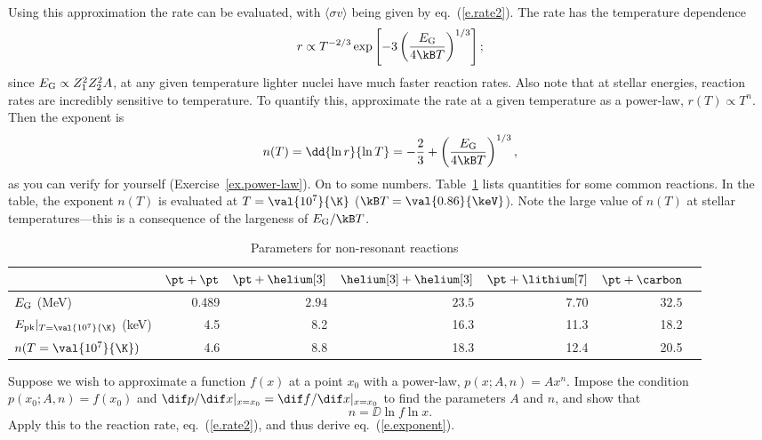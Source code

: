 Using this approximation the rate can be evaluated, with $\langle\sigma v\rangle$ being given by eq.~(\ref{e.rate2}). The rate has the temperature dependence
\[
	r \propto T^{-2/3} \exp\left[-3\left(\frac{\EG}{4\kB T}\right)^{1/3}\right];
\]
since $E_{\mathrm{G}} \propto Z_{1}^{2}Z_{2}^{2}A$, at any given temperature lighter nuclei have much faster reaction rates. Also note that at stellar energies, reaction rates are incredibly sensitive to temperature. To quantify this, approximate the rate at a given temperature as a power-law, $r(T)\propto T^{n}$. Then the exponent is
\begin{equation}\label{e.exponent}
 n(T) = \dd{\ln r}{\ln T} = -\frac{2}{3} + \left(\frac{\EG}{4\kB T}\right)^{1/3},
\end{equation}
as you can verify for yourself (Exercise~\ref{ex.power-law}). On to some numbers. Table~\ref{t.reaction} lists quantities for some common reactions. 
In the table, the exponent $n(T)$ is evaluated at $T = \val{10^{7}}{\K}$ ($\kB T = \val{0.86}{\keV}$). Note the large value of $n(T)$ at stellar temperatures---this is a consequence of the largeness of $\EG/\kB T$.
 
\begin{table}[hb]
\caption{\label{t.reaction} Parameters for non-resonant reactions}
\begin{tabular}{lrrrrrr}
 & $\pt+\pt$ & $\pt+\helium[3]$ & $\helium[3]+\helium[3]$ & $\pt+\lithium[7]$ & $\pt+\carbon$\\
\hline
$E_{\mathrm{G}}$ (MeV) & 0.489 & $2.94$ & $23.5$ & $7.70$ & $32.5$\\
$\Epk|_{T=\val{10^{7}}{\K}}$ (keV) & 4.5 & 8.2 & 16.3 & 11.3 & 18.2\\
$n(T = \val{10^{7}}{\K})$ & 4.6 & 8.8 & 18.3 & 12.4 & 20.5\\
\end{tabular}
\end{table}

\begin{exercisebox}
\label{ex.power-law}
Suppose we wish to approximate a function $f(x)$ at a point $x_{0}$ with a power-law, $p(x;A,n) = Ax^{n}$. Impose the condition $p(x_{0};A,n) = f(x_{0})$ and $\dif p/\dif x |_{x=x_{0}} = \dif f/\dif x|_{x=x_{0}}$ to find the parameters $A$ and $n$, and show that
\[
	n = \DD{\ln f}{\ln x}.
\]
Apply this to the reaction rate, eq.~(\ref{e.rate2}), and thus derive eq.~(\ref{e.exponent}).
\end{exercisebox}

